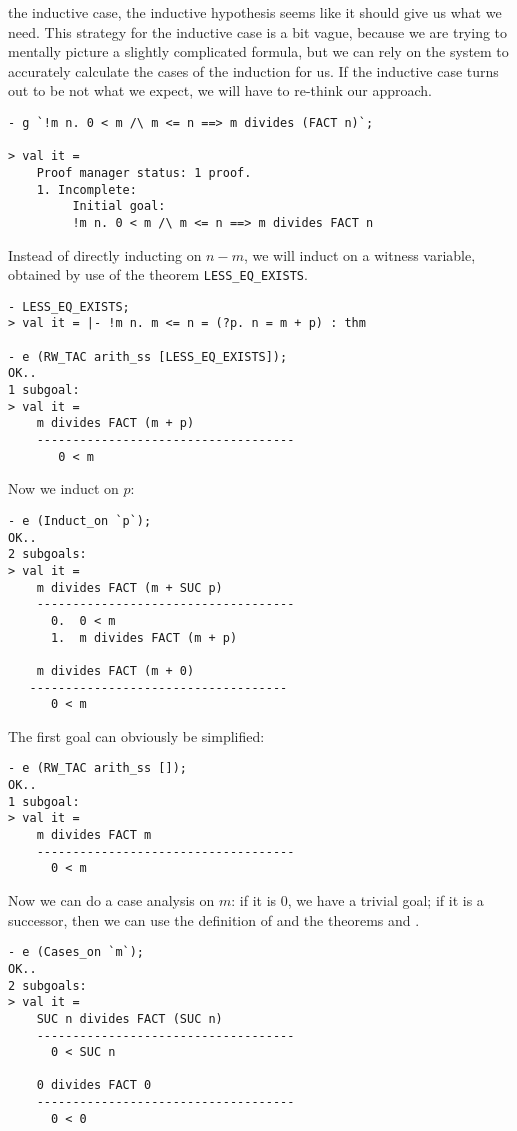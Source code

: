 the inductive case, the inductive hypothesis seems like it should give
us what we need. This strategy for the inductive case is a bit vague,
because we are trying to mentally picture a slightly complicated
formula, but we can rely on the system to accurately calculate the
cases of the induction for us. If the inductive case turns out to be
not what we expect, we will have to re-think our approach.
\begin{session}
\begin{verbatim}
- g `!m n. 0 < m /\ m <= n ==> m divides (FACT n)`;

> val it =
    Proof manager status: 1 proof.
    1. Incomplete:
         Initial goal:
         !m n. 0 < m /\ m <= n ==> m divides FACT n
\end{verbatim}
\end{session}
Instead of directly inducting on $n-m$, we will induct on a witness
variable, obtained by use of the theorem \verb+LESS_EQ_EXISTS+.
\begin{session}
\begin{verbatim}
- LESS_EQ_EXISTS;
> val it = |- !m n. m <= n = (?p. n = m + p) : thm

- e (RW_TAC arith_ss [LESS_EQ_EXISTS]);
OK..
1 subgoal:
> val it =
    m divides FACT (m + p)
    ------------------------------------
       0 < m
\end{verbatim}
\end{session}
\noindent Now we induct on $p$:
\begin{session}
\begin{verbatim}
- e (Induct_on `p`);
OK..
2 subgoals:
> val it =
    m divides FACT (m + SUC p)
    ------------------------------------
      0.  0 < m
      1.  m divides FACT (m + p)

    m divides FACT (m + 0)
   ------------------------------------
      0 < m
\end{verbatim}
\end{session}
\noindent The first goal can obviously be simplified:
\begin{session}
\begin{verbatim}
- e (RW_TAC arith_ss []);
OK..
1 subgoal:
> val it =
    m divides FACT m
    ------------------------------------
      0 < m
\end{verbatim}
\end{session}
\noindent Now we can do a case analysis on $m$: if it is $0$, we have a
trivial goal; if it is a successor, then we can use the definition of
 and the theorems  and
.
\begin{session}
\begin{verbatim}
- e (Cases_on `m`);
OK..
2 subgoals:
> val it =
    SUC n divides FACT (SUC n)
    ------------------------------------
      0 < SUC n

    0 divides FACT 0
    ------------------------------------
      0 < 0
\end{verbatim}
\end{session}

